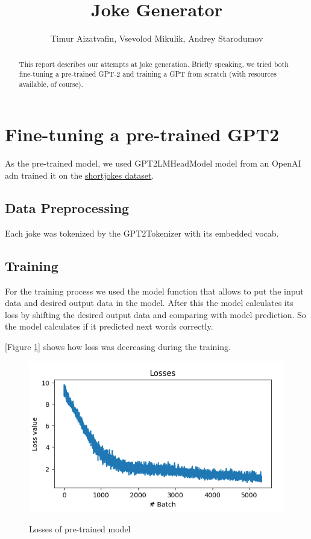 \documentclass[12pt]{article}
\begin{document}
\title{Joke Generator}
\author{Timur Aizatvafin, Vsevolod Mikulik, Andrey Starodumov}

\maketitle

\begin{abstract}
	This report describes our attempts at joke generation. Briefly speaking, we tried both fine-tuning a pre-trained GPT-2 and
    training a GPT from scratch (with resources available, of course).
\end{abstract}

\section{Fine-tuning a pre-trained GPT2}
As the pre-trained model, we used GPT2LMHeadModel model from an OpenAI adn trained it on the \href{https://www.kaggle.com/datasets/abhinavmoudgil95/short-jokes}{shortjokes dataset}.
    
\subsection{Data Preprocessing}
Each joke was tokenized by the GPT2Tokenizer with its embedded vocab.

\subsection{Training}
For the training process we used the model function that allows to put the input data and desired output data in the model. After this the model calculates its loss by shifting the desired output data and comparing with model prediction. So the model calculates if it predicted next words correctly.

[Figure \ref{pic:gpt2-loss}] shows how loss was decreasing during the training.

\begin{figure}[ht]
\caption{Losses of pre-trained model}
\includegraphics[width=\textwidth]{img/gpt2-loss.png}
\label{pic:gpt2-loss}
\end{figure}
\end{document}
